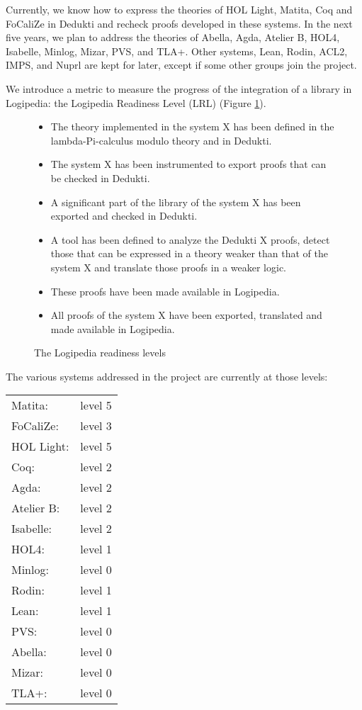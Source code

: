 Currently, we know how to express the theories of {\sc HOL Light},
{\sc Matita}, {\sc Coq} and {\sc FoCaliZe} in {\sc Dedukti} and recheck proofs
developed in these systems. In the next five years, we plan to address
the theories of {\sc Abella}, {\sc Agda}, {\sc Atelier B},
{\sc HOL4}, {\sc Isabelle}, {\sc Minlog}, {\sc Mizar},
{\sc PVS}, and {\sc TLA+}. Other systems, {\sc Lean}, {\sc Rodin}, {\sc ACL2},
{\sc IMPS}, and {\sc Nuprl} are kept for later, except if some other
groups join the project.

We introduce a metric to measure the progress of the
integration of a library in Logipedia: the Logipedia Readiness Level (LRL) (Figure \ref{lrl}).

\begin{figure}[ht]
\begin{itemize}
\item[LRL Level 1:]
The theory implemented in the system X has been defined in
the lambda-Pi-calculus modulo theory and in Dedukti.

\item[LRL Level 2:]
The system X has been instrumented to export proofs that
can be checked in Dedukti.

\item[LRL Level 3:]
A significant part of the library of the system X has been exported and checked in Dedukti.

\item[LRL Level 4:]
A tool has been defined to analyze the Dedukti X proofs,
detect those that can be expressed in a theory weaker than that of the
system X and translate those proofs in a weaker logic.

\item[LRL Level 5:]
These proofs have been made available in Logipedia.

\item[LRL Level 6:]
All proofs of the system X have been exported, translated
and made available in Logipedia.
\end{itemize}
\caption{The Logipedia readiness levels \label{lrl}}
\end{figure}

The various systems addressed in the project are currently at those levels:

\begin{tabular}{ll}
Matita:& level 5\\
FoCaliZe:& level 3\\
HOL Light:& level 5\\
Coq:& level 2\\
Agda:& level 2\\
Atelier B:& level 2\\
Isabelle:& level 2\\
HOL4:& level 1\\
Minlog:& level 0\\
Rodin:& level 1\\
Lean:& level 1\\
PVS:& level 0\\
Abella:& level 0\\
Mizar:& level 0\\
TLA+:& level 0
\end{tabular}

